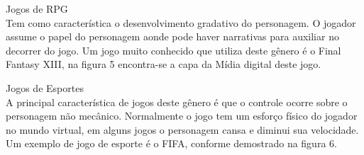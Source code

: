 \begin{alineascomponto}
\item Jogos de RPG\\
Tem como característica o desenvolvimento gradativo do personagem. O jogador assume o papel do personagem aonde pode haver narrativas para auxiliar no decorrer do jogo.
Um jogo muito conhecido que utiliza deste gênero é o Final Fantasy XIII,  na figura 5 encontra-se a capa da Mídia digital deste jogo. \cite{gen1}
\end{alineascomponto}
\pagebreak
\begin{figure}[h!]
		\centering
	\end{figure}
	
\begin{alineascomponto}
\item Jogos de Esportes\\
A principal característica de jogos deste gênero é que o controle ocorre sobre o personagem não mecânico. Normalmente o jogo tem um esforço físico do jogador no mundo virtual, em alguns jogos o personagem cansa e diminui sua velocidade. Um exemplo de jogo de esporte é o FIFA, conforme demostrado na figura 6. \cite{gen1}

\end{alineascomponto}
\begin{figure}[h!]
		\centering
	\end{figure}
	
